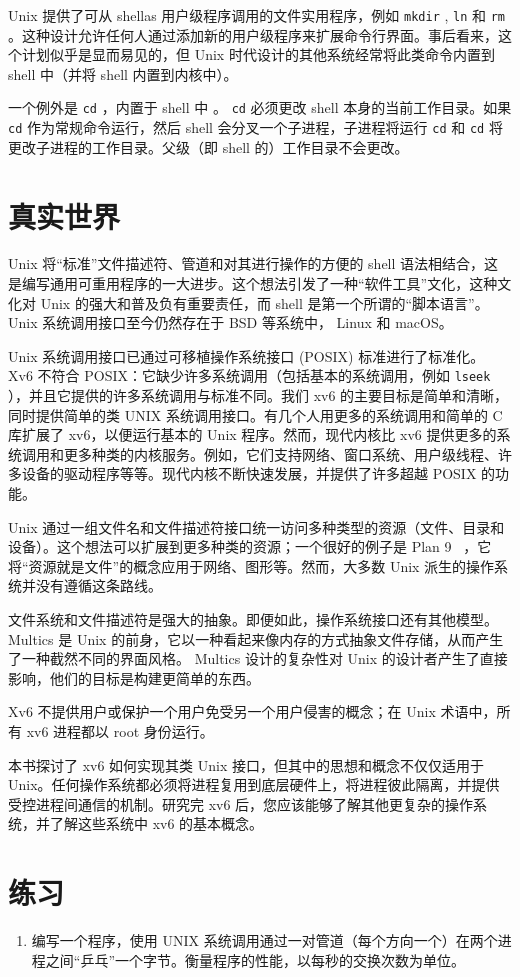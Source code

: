 \documentclass[UTF8]{article}
\begin{document}
Unix 提供了可从 shellas 用户级程序调用的文件实用程序，例如
    \lstinline{mkdir}    ,
    \lstinline{ln}    和
    \lstinline{rm}    。这种设计允许任何人通过添加新的用户级程序来扩展命令行界面。事后看来，这个计划似乎是显而易见的，但 Unix 时代设计的其他系统经常将此类命令内置到 shell 中（并将 shell 内置到内核中）。  

一个例外是
    \lstinline{cd}    ，内置于 shell 中
        。
    \lstinline{cd}    必须更改 shell 本身的当前工作目录。如果
    \lstinline{cd}    作为常规命令运行，然后 shell 会分叉一个子进程，子进程将运行
    \lstinline{cd}    和
    \lstinline{cd}    将更改子进程的工作目录。父级（即 shell 的）工作目录不会更改。
    \section{真实世界  }     

Unix 将“标准”文件描述符、管道和对其进行操作的方便的 shell 语法相结合，这是编写通用可重用程序的一大进步。这个想法引发了一种“软件工具”文化，这种文化对 Unix 的强大和普及负有重要责任，而 shell 是第一个所谓的“脚本语言”。Unix 系统调用接口至今仍然存在于 BSD 等系统中， Linux 和 macOS。  

Unix 系统调用接口已通过可移植操作系统接口 (POSIX) 标准进行了标准化。 Xv6 不符合 POSIX：它缺少许多系统调用（包括基本的系统调用，例如
    \lstinline{lseek}    ），并且它提供的许多系统调用与标准不同。我们 xv6 的主要目标是简单和清晰，同时提供简单的类 UNIX 系统调用接口。有几个人用更多的系统调用和简单的 C 库扩展了 xv6，以便运行基本的 Unix 程序。然而，现代内核比 xv6 提供更多的系统调用和更多种类的内核服务。例如，它们支持网络、窗口系统、用户级线程、许多设备的驱动程序等等。现代内核不断快速发展，并提供了许多超越 POSIX 的功能。  

Unix 通过一组文件名和文件描述符接口统一访问多种类型的资源（文件、目录和设备）。这个想法可以扩展到更多种类的资源；一个很好的例子是 Plan 9~    \cite{Presotto91plan9}    ，它将“资源就是文件”的概念应用于网络、图形等。然而，大多数 Unix 派生的操作系统并没有遵循这条路线。  

文件系统和文件描述符是强大的抽象。即便如此，操作系统接口还有其他模型。 Multics 是 Unix 的前身，它以一种看起来像内存的方式抽象文件存储，从而产生了一种截然不同的界面风格。 Multics 设计的复杂性对 Unix 的设计者产生了直接影响，他们的目标是构建更简单的东西。  

Xv6 不提供用户或保护一个用户免受另一个用户侵害的概念；在 Unix 术语中，所有 xv6 进程都以 root 身份运行。  

本书探讨了 xv6 如何实现其类 Unix 接口，但其中的思想和概念不仅仅适用于 Unix。任何操作系统都必须将进程复用到底层硬件上，将进程彼此隔离，并提供受控进程间通信的机制。研究完 xv6 后，您应该能够了解其他更复杂的操作系统，并了解这些系统中 xv6 的基本概念。
    \section{练习  }     

   \begin{enumerate}


   \item   编写一个程序，使用 UNIX 系统调用通过一对管道（每个方向一个）在两个进程之间“乒乓”一个字节。衡量程序的性能，以每秒的交换次数为单位。  \end{enumerate}     
\end{document}
